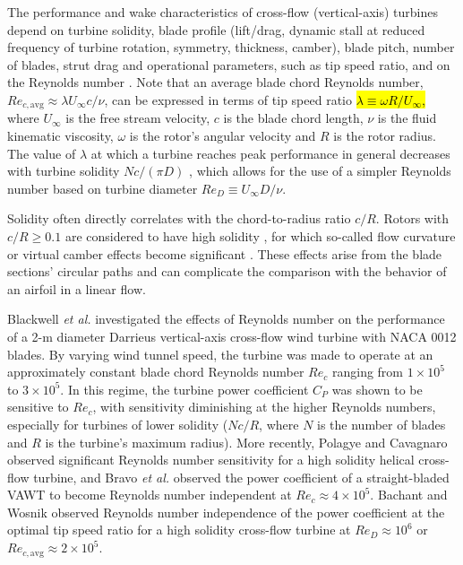 \documentclass[energies,article,accept,moreauthors,pdftex,10pt,a4paper]{mdpi}
\theoremstyle{mdpi}
\newcounter{ex}
\newcounter{re}
\begin{document}
The performance and wake characteristics of cross-flow (vertical-axis) turbines
depend on turbine solidity, blade profile (lift/drag, dynamic stall at reduced
frequency of turbine rotation, symmetry, thickness, camber), blade pitch, number
of blades, strut drag and operational parameters, such as tip speed ratio, {
 and} on the Reynolds number \cite{Para2002}. Note that an average blade chord
Reynolds number, $Re_{c,\mathrm{avg}} \approx \lambda U_\infty c/ \nu$, can be
expressed in terms of tip speed ratio \hl {$\lambda \equiv \omega R/ U_\infty$, } 
where
$U_\infty$ is the free stream velocity, $c$ is the blade chord length, $\nu$ is
the fluid kinematic viscosity, $\omega$ is the rotor's angular velocity and $R$
is the rotor radius. The value of $\lambda$ at which a turbine reaches peak
performance in general decreases with turbine solidity $Nc/(\pi D)$
\cite{Templin1974}, which allows for the use of a simpler Reynolds number based
on turbine diameter $Re_D \equiv U_\infty D/\nu$.

Solidity often directly correlates with the chord-to-radius ratio $c/R$. Rotors
with $c/R \ge 0.1$ are considered to have high solidity \cite{Fiedler2009}, for which
so-called flow curvature or virtual camber effects become significant
\cite{Migliore1980}. These effects arise from the blade sections' circular
paths and can complicate the comparison with the behavior of an airfoil in a linear
flow.

Blackwell \emph{et al.} \cite{Blackwell1976} investigated the effects of Reynolds
number on the performance of a 2-m diameter Darrieus vertical-axis cross-flow
wind turbine with NACA 0012 blades. By varying wind tunnel speed, the turbine
was made to operate at an approximately constant blade chord Reynolds number $Re_c$
ranging from $1 \times 10^5$ to $3 \times 10^5$. In this regime, the turbine
power coefficient $C_P$ was shown to be sensitive to $Re_c$, with sensitivity
diminishing at the higher Reynolds numbers, especially for turbines of lower
solidity ($Nc/R$, where $N$ is the number of blades and $R$ is the turbine's
maximum radius). More recently, Polagye and Cavagnaro \cite{Polagye2013b}
observed significant Reynolds number sensitivity for a high solidity helical
cross-flow turbine, and Bravo \emph{et al.} \cite{Bravo2007} observed the power
coefficient of a straight-bladed VAWT to become Reynolds number independent at
$Re_c \approx 4 \times 10^5$. Bachant and Wosnik \cite{Bachant2014} observed
Reynolds number independence of the power coefficient at the optimal tip speed ratio for
a high solidity cross-flow turbine at $Re_D \approx 10^6$ or
$Re_{c,\mathrm{avg}} \approx 2 \times 10^5$.
\end{document}
